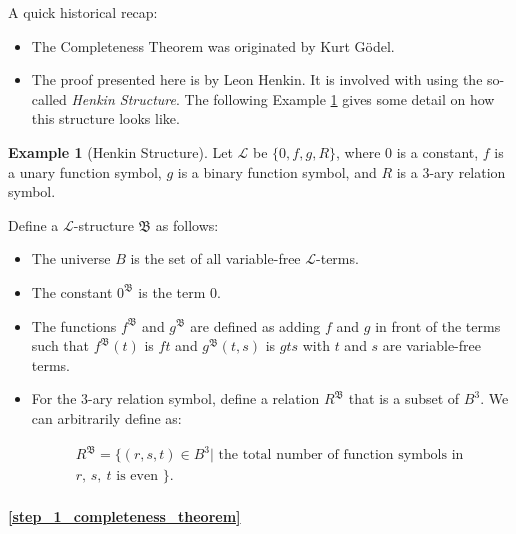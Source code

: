 \documentclass[11pt,letterpaper]{book}
\theoremstyle{definition}
\newtheorem{example}{Example}[section]
\begin{document}
A quick historical recap:
\begin{itemize}
\item{The Completeness Theorem was originated by Kurt G\"odel.}
\item{The proof presented here is by Leon Henkin. It is involved with
using the so-called \emph{Henkin Structure}. The following Example
\ref{zb:henkin_structure} gives some detail on how this structure looks
like.}
\end{itemize}



\begin{example}[Henkin Structure]\label{zb:henkin_structure}
Let $\mathcal{L}$ be $\{ 0,f, g, R \}$, where $0$ is a constant, $f$ is
a unary function symbol, $g$ is a binary function symbol, and $R$ is a
$3$-ary relation symbol.

Define a $\mathcal{L}$-structure $\mathfrak{B}$ as follows:
\begin{itemize}
\item{The universe $B$ is the set of all variable-free $\mathcal{L}$-terms.}
\item{The constant $0^{\mathfrak{B}}$ is the term $0$.}
\item{The functions $f^{\mathfrak{B}}$ and $g^{\mathfrak{B}}$ are
defined as adding $f$ and $g$ in front of the terms such that
$f^{\mathfrak{B}} (t)$ is $ft$ and $g^{\mathfrak{B}} (t, s) $ is $g t s
$ with $t$ and $s$ are variable-free terms.}
\item{For the $3$-ary relation symbol, define a relation
$R^{\mathfrak{B}}$ that is a subset of $B^3$. We can arbitrarily define
as:} 

\begin{equation}
\begin{split}
R^{\mathfrak{B}} =\{ (r,s,t) \in B^3 | \text{ the total number of
function symbols in } \\ r,\, s,\ t \text{ is even } \} .
\end{split} \nonumber
\end{equation}

\end{itemize}
\end{example}

\paragraph{\ref{step_1_completeness_theorem}}
\end{document}
